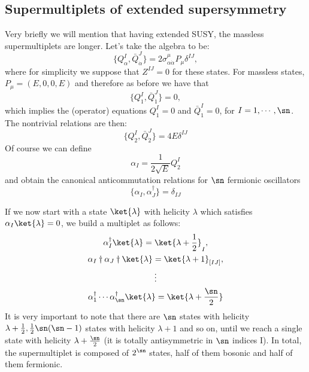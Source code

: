 \subsection{Supermultiplets of extended supersymmetry}
Very briefly we will mention that having extended SUSY, the massless
supermultiplets are longer. Let's take the algebra to be:
\begin{equation}
  \{Q_\alpha^I,\bar{Q}_{\dot{\alpha}}^J\} = 2\sigma_{\alpha\dot{\alpha}}^\mu
  P_\mu\delta^{IJ},
\end{equation}
where for simplicity we suppose that $Z^{IJ}=0$ for these states. For massless
states, $P_\mu = (E,0,0,E)$ and therefore as before we have that
\begin{equation}
  \{Q_1^I,\bar{Q}_{\dot{1}}^J\} = 0,
\end{equation}
which implies the (operator) equations $Q_1^I=0$ and $\bar{Q}_{\dot{1}}^I=0$,
for $I=1,\cdots,\sn$. The nontrivial relations are then:
\begin{equation}
\{Q_2^I, \bar{Q}_{\dot{2}}^J\} = 4E\delta^{IJ}
\end{equation}
Of course we can define
\begin{equation}
  \alpha_I = \frac{1}{2\sqrt{E}}Q_2^I
\end{equation}
and obtain the canonical anticommutation relations for $\sn$ fermionic
oscillators
\begin{equation}
  \{\alpha_I,\alpha_J^\dagger\} = \delta_{IJ}
\end{equation}
\par If we now start with a state $\ket{\lambda}$ with helicity $\lambda$ which
satisfies $\alpha_I\ket{\lambda} = 0$, we build a multiplet as follows:
\begin{gather}
  \alpha_I^\dagger\ket{\lambda} = \ket{\lambda + \frac{1}{2}}_I,\nonumber\\
  \alpha_I\dagger\alpha_J\dagger\ket{\lambda} = \ket{\lambda
  + 1}_{[IJ]},\nonumber\\
  \vdots\nonumber\\
  \alpha_1^\dagger\cdots\alpha_{\sn}^\dagger\ket{\lambda}
  = \ket{\lambda+\frac{\sn}{2}}
\end{gather}
It is very important to note that there are $\sn$ states with helicity
$\lambda + \frac{1}{2}, \frac{1}{2}\sn(\sn-1)$ states with
helicity $\lambda + 1$ and so on, until we reach a single state with helicity $\lambda
+\frac{\sn}{2}$ (it is totally antisymmetric in $\sn$ indices
I). In total, the supermultiplet is composed of $2^\sn$ states, half of
them bosonic and half of them fermionic.
